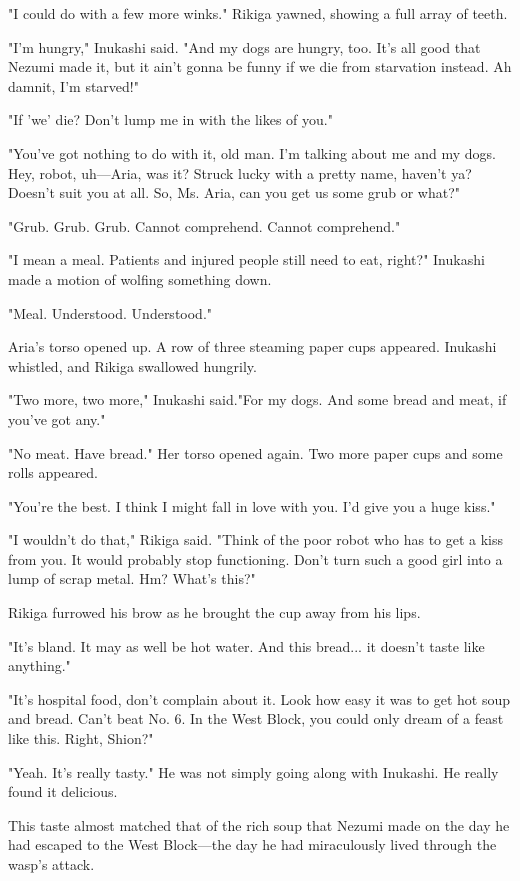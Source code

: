 "I could do with a few more winks." Rikiga yawned, showing a full array
of teeth.

"I'm hungry," Inukashi said. "And my dogs are hungry, too. It's all good
that Nezumi made it, but it ain't gonna be funny if we die from
starvation instead. Ah damnit, I'm starved!"

"If 'we' die? Don't lump me in with the likes of you."

"You've got nothing to do with it, old man. I'm talking about me and my
dogs. Hey, robot, uh---Aria, was it? Struck lucky with a pretty name,
haven't ya? Doesn't suit you at all. So, Ms. Aria, can you get us some
grub or what?"

{\sffamily "Grub. Grub. Grub. Cannot comprehend. Cannot comprehend."}

"I mean a meal. Patients and injured people still need to eat, right?"
Inukashi made a motion of wolfing something down.

{\sffamily "Meal. Understood. Understood."}

Aria's torso opened up. A row of three steaming paper cups appeared.
Inukashi whistled, and Rikiga swallowed hungrily.

"Two more, two more," Inukashi said."For my dogs. And some bread and
meat, if you've got any."

{\sffamily "No meat. Have bread."} Her torso opened again. Two more paper cups and
some rolls appeared.

"You're the best. I think I might fall in love with you. I'd give you a
huge kiss."

"I wouldn't do that," Rikiga said. "Think of the poor robot who has to
get a kiss from you. It would probably stop functioning. Don't turn such
a good girl into a lump of scrap metal. Hm? What's this?"

Rikiga furrowed his brow as he brought the cup away from his lips.

"It's bland. It may as well be hot water. And this bread... it doesn't
taste like anything."

"It's hospital food, don't complain about it. Look how easy it was to
get hot soup and bread. Can't beat No. 6. In the West Block, you could
only dream of a feast like this. Right, Shion?"

"Yeah. It's really tasty." He was not simply going along with Inukashi.
He really found it delicious.

This taste almost matched that of the rich soup that Nezumi made on the
day he had escaped to the West Block---the day he had miraculously lived
through the wasp's attack.

